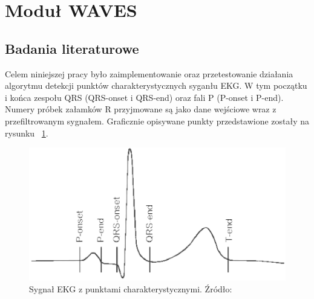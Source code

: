 \section{Moduł WAVES}

\subsection{Badania literaturowe}

Celem niniejszej pracy było zaimplementowanie oraz przetestowanie działania algorytmu  detekcji punktów charakterystycznych syganłu EKG. W tym początku i końca zespołu QRS (QRS-onset i QRS-end) oraz fali P (P-onset i P-end). Numery próbek załamków R przyjmowane są  jako dane wejściowe wraz z przefiltrowanym sygnałem. Graficznie opisywane punkty przedstawione zostały na rysunku ~\ref{fig:Waves_EKG}.


\begin{figure}[h]
\centering
\includegraphics[width=\textwidth,keepaspectratio] {Waves/img/EKG_pts.eps}
\caption{Sygnał EKG z punktami charakterystycznymi. Źródło: \cite{Waves_PSED}}
\label{fig:Waves_EKG}
\end{figure}

